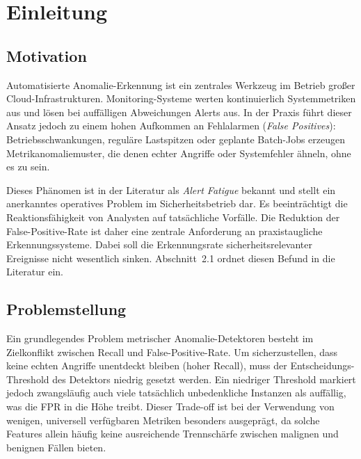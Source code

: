 
\section{Einleitung}

\subsection{Motivation}

Automatisierte Anomalie-Erkennung ist ein zentrales Werkzeug im Betrieb großer
Cloud-Infrastrukturen. Monitoring-Systeme werten kontinuierlich Systemmetriken aus
und lösen bei auffälligen Abweichungen Alerts aus. In der Praxis führt dieser Ansatz
jedoch zu einem hohen Aufkommen an Fehlalarmen (\emph{False Positives}):
Betriebsschwankungen, reguläre Lastspitzen oder geplante Batch-Jobs erzeugen
Metrikanomaliemuster, die denen echter Angriffe oder Systemfehler ähneln, ohne es zu sein.

Dieses Phänomen ist in der Literatur als \emph{Alert Fatigue} bekannt und stellt ein
anerkanntes operatives Problem im Sicherheitsbetrieb dar. Es beeinträchtigt die
Reaktionsfähigkeit von Analysten auf tatsächliche Vorfälle. Die Reduktion der
False-Positive-Rate ist daher eine zentrale Anforderung an praxistaugliche
Erkennungssysteme. Dabei soll die Erkennungsrate sicherheitsrelevanter Ereignisse
nicht wesentlich sinken. Abschnitt~2.1 ordnet diesen Befund in die Literatur ein.

\subsection{Problemstellung}

Ein grundlegendes Problem metrischer Anomalie-Detektoren besteht im Zielkonflikt
zwischen Recall und False-Positive-Rate. Um sicherzustellen, dass keine echten
Angriffe unentdeckt bleiben (hoher Recall), muss der Entscheidungs-Threshold des
Detektors niedrig gesetzt werden. Ein niedriger Threshold markiert jedoch
zwangsläufig auch viele tatsächlich unbedenkliche Instanzen als auffällig, was
die FPR in die Höhe treibt. Dieser Trade-off ist bei der Verwendung von wenigen,
universell verfügbaren Metriken besonders ausgeprägt, da solche Features allein
häufig keine ausreichende Trennschärfe zwischen malignen und benignen Fällen
bieten.

